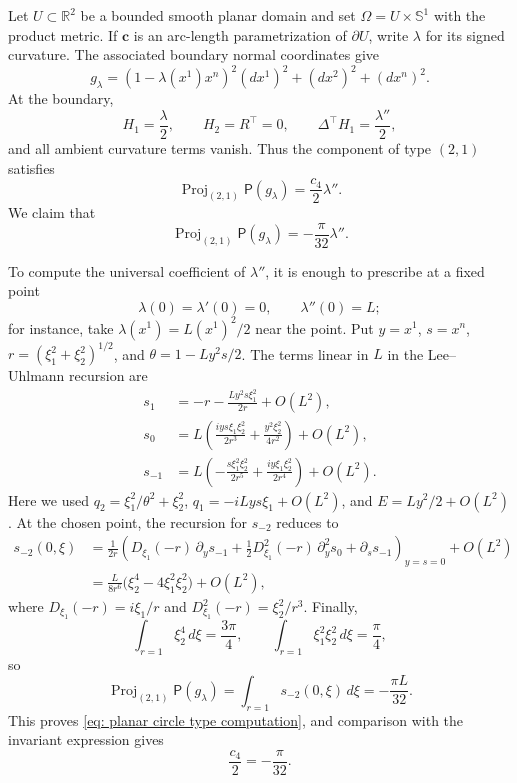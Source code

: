 \documentclass[11pt]{amsart}
\newcommand{\Proj}{\operatorname{Proj}}
\theoremstyle{definition}
\numberwithin{equation}{section}
\begin{document}
Let $U\subset\mathbb R^2$ be a bounded smooth planar domain and set
$\Omega=U\times\mathbb S^1$ with the product metric.  If
$\mathbf c$ is an arc-length parametrization of $\partial U$, write $\lambda$ for its signed curvature.  The associated boundary normal coordinates give
\[
 g_\lambda=(1-\lambda(x^1)x^n)^2(dx^1)^2+(dx^2)^2+(dx^n)^2.
\]
At the boundary,
\[
 H_1=\frac\lambda2,\qquad H_2=R^\top=0,
 \qquad \Delta^\top H_1=\frac{\lambda''}{2},
\]
and all ambient curvature terms vanish.  Thus the component of type $(2,1)$ satisfies
\[
 \Proj_{(2,1)}\mathsf P(g_\lambda)=\frac{c_4}{2}\lambda''.
\]
We claim that
\begin{equation}\label{eq: planar circle type computation}
 \Proj_{(2,1)}\mathsf P(g_\lambda)=-\frac\pi{32}\lambda''.
\end{equation}

To compute the universal coefficient of $\lambda''$, it is enough to prescribe at a fixed point
\[
 \lambda(0)=\lambda'(0)=0,\qquad \lambda''(0)=L;
\]
for instance, take $\lambda(x^1)=L(x^1)^2/2$ near the point.  Put
$y=x^1$, $s=x^n$, $r=(\xi_1^2+\xi_2^2)^{1/2}$, and
$\theta=1-Ly^2s/2$.  The terms linear in $L$ in the Lee--Uhlmann recursion are
\begin{align*}
 s_1&=-r-\frac{Ly^2s\xi_1^2}{2r}+O(L^2),\\
 s_0&=L\left(
 \frac{iys\xi_1\xi_2^2}{2r^3}
 +\frac{y^2\xi_2^2}{4r^2}\right)+O(L^2),\\
 s_{-1}&=L\left(
 -\frac{s\xi_1^2\xi_2^2}{2r^5}
 +\frac{iy\xi_1\xi_2^2}{2r^4}\right)+O(L^2).
\end{align*}
Here we used
$q_2=\xi_1^2/\theta^2+\xi_2^2$,
$q_1=-iLys\xi_1+O(L^2)$, and
$E=Ly^2/2+O(L^2)$.
At the chosen point, the recursion for $s_{-2}$ reduces to
\begin{align*}
    s_{-2}(0,\xi)
    &=\frac1{2r}\left(
    D_{\xi_1}(-r)\,\partial_ys_{-1}
    +\frac12D_{\xi_1}^2(-r)\,\partial_y^2s_0
    +\partial_ss_{-1}\right)_{y=s=0}+O(L^2)\\
    &=\frac{L}{8r^6}\bigl(\xi_2^4-4\xi_1^2\xi_2^2\bigr)+O(L^2),
   \end{align*}
where $D_{\xi_1}(-r)=i\xi_1/r$ and $D_{\xi_1}^2(-r)=\xi_2^2/r^3$.
Finally,
\[
 \int_{r=1}\xi_2^4\,d\xi=\frac{3\pi}{4},\qquad
 \int_{r=1}\xi_1^2\xi_2^2\,d\xi=\frac\pi4,
\]
so
\[
 \Proj_{(2,1)}\mathsf P(g_\lambda)
 =\int_{r=1}s_{-2}(0,\xi)\,d\xi
 =-\frac{\pi L}{32}.
\]
This proves \eqref{eq: planar circle type computation}, and comparison with the invariant expression gives
\begin{equation}\label{eq: c_1-c_8 10}
 \frac{c_4}{2}=-\frac\pi{32}.
\end{equation}
\end{document}
